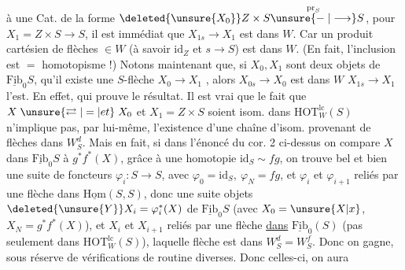 à une  Cat.  de la forme $\deleted{\unsure{X_0}}Z\times S\overset{\mathrm{pr}_S}{\unsure{\relbar|\longrightarrow}}S$, 
 pour $X_1=Z\times S\longrightarrow S$, il est immédiat que $X_{1s}\longrightarrow X_1$ est dans $W$. Car  un produit cartésien de flèches $\in W$ (à savoir $\mathrm{id}_Z$ et $s\longrightarrow S$) est dans $W$. (En fait, l'inclusion est $=$  homotopisme !)
Notons maintenant que, si $X_0,X_1$ sont deux  objets de $\underline{\mathrm{Fib}}_0 S$,   qu'il existe une $S$-flèche $X_0\longrightarrow X_1$ , alors $X_{0s}\longrightarrow X_0$ est dans $W$  $X_{1s}\longrightarrow X_1$ l'est. En effet, 
qui prouve le résultat.
Il est vrai que le fait que $X\mathrel{\unsure{\rightleftarrows|=|et}}X_0$ et $X_1=Z\times S$ soient isom. dans $\mathrm{HOT}_W^{\mathrm{lc}}(S)$ n'implique pas, par lui-même, l'existence d'une
chaîne d'isom. provenant de flèches dans $W_S^d$. Mais en fait, si  dans l'énoncé du cor. 2 ci-dessus on compare $X$ dans $\underline{\mathrm{Fib}}_0 S$ à $g^*f^*(X)$, grâce à une homotopie
$\mathrm{id}_S\sim fg$, on trouve bel et bien une suite de foncteurs $\varphi_i:S\longrightarrow S$, avec $\varphi_0=\mathrm{id}_S,\ \varphi_N=fg$, et $\varphi_i$ et $\varphi_{i+1}$ reliés par une flèche \unsure{$\psi$} dans $\underline{\mathrm{Hom}}(S,S)$, donc  une suite  objets
$\deleted{\unsure{Y}}X_i=\varphi_i^*(X)$ de $\underline{\mathrm{Fib}}_0 S$ (avec $X_0=\unsure{X|x}$, $X_N=g^*f^*(X)$), et $X_i$ et $X_{i+1}$ reliés par une flèche \uline{dans} $\underline{\mathrm{Fib}}_0(S)$ (pas seulement dans $\mathrm{HOT}_W^{\mathrm{lc}}(S)$), laquelle flèche est dans $W_S^d=W_S^f$. Donc on gagne, sous réserve de vérifications de routine diverses. Donc  celles-ci, on aura

